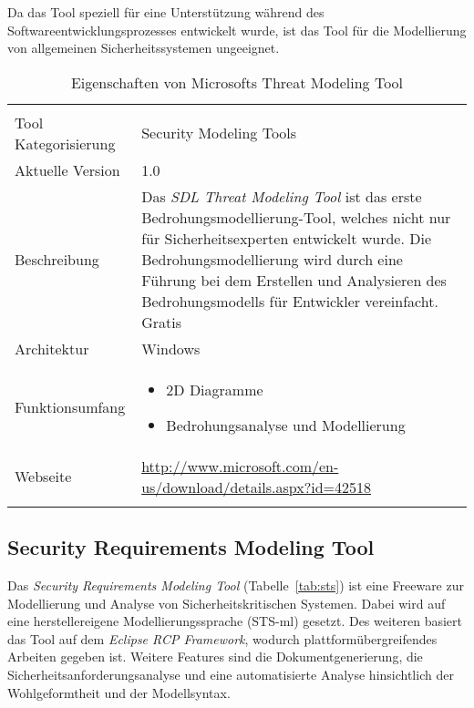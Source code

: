 Da das Tool speziell für eine Unterstützung während des Softwareentwicklungsprozesses entwickelt wurde, ist das Tool für die Modellierung von allgemeinen Sicherheitssystemen ungeeignet.

\begin{table}[htbp]
\renewcommand{\arraystretch}{1.5}
\caption{Eigenschaften von Microsofts Threat Modeling Tool}
\label{tab:mstool}
\begin{tabularx}{\textwidth}{ l !{\color{white}\vrule}  X }
{}   					\\
\hline
{}Tool Kategorisierung 	& Security Modeling Tools	\\
\hline
{}Aktuelle Version  		& 1.0								\\
\hline
{}Beschreibung				&  Das \textit{SDL Threat Modeling Tool} ist das erste Bedrohungsmodellierung-Tool, welches nicht nur für Sicherheitsexperten entwickelt wurde. Die Bedrohungsmodellierung wird durch eine Führung bei dem Erstellen und Analysieren des Bedrohungsmodells für Entwickler vereinfacht.
		\linebreak \linebreak Gratis							\\
\hline
{}Architektur				& Windows \\
\hline
{}Funktionsumfang		& \begin{itemize}
										\item  2D Diagramme
										\item Bedrohungsanalyse und Modellierung
									\end{itemize}\\
\hline
{} Webseite		&		\url{http://www.microsoft.com/en-us/download/details.aspx?id=42518} \\
\hline
\end{tabularx}
\end{table}

\subsection{Security Requirements Modeling Tool}
Das \textit{Security Requirements Modeling Tool} (Tabelle~\ref{tab:sts}) ist eine Freeware zur Modellierung und Analyse von Sicherheitskritischen Systemen. Dabei wird auf eine herstellereigene Modellierungssprache  (STS-ml) gesetzt. Des weiteren basiert das Tool auf dem \textit{Eclipse RCP Framework}, wodurch  plattformübergreifendes Arbeiten gegeben ist. Weitere Features  sind die Dokumentgenerierung, die Sicherheitsanforderungsanalyse und eine automatisierte Analyse hinsichtlich der Wohlgeformtheit und der Modellsyntax.

